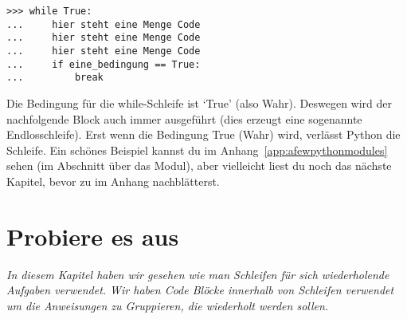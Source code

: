 \begin{Verbatim}[frame=single]
>>> while True:
...     hier steht eine Menge Code
...     hier steht eine Menge Code
...     hier steht eine Menge Code
...     if eine_bedingung == True:
...         break
\end{Verbatim}
Die Bedingung für die while-Schleife ist `True' (also Wahr). Deswegen wird der nachfolgende Block auch immer ausgeführt (dies erzeugt eine sogenannte Endlosschleife). Erst wenn die Bedingung  True (Wahr) wird, verlässt Python die Schleife. Ein schönes Beispiel kannst du im Anhang~\ref{app:afewpythonmodules} sehen (im Abschnitt über das  Modul), aber vielleicht liest du noch das nächste Kapitel, bevor zu im Anhang nachblätterst.


\section{Probiere es aus}

\emph{In diesem Kapitel haben wir gesehen wie man Schleifen für sich wiederholende Aufgaben verwendet. Wir haben Code Blöcke innerhalb von Schleifen verwendet um die Anweisungen zu Gruppieren, die wiederholt werden sollen.}

